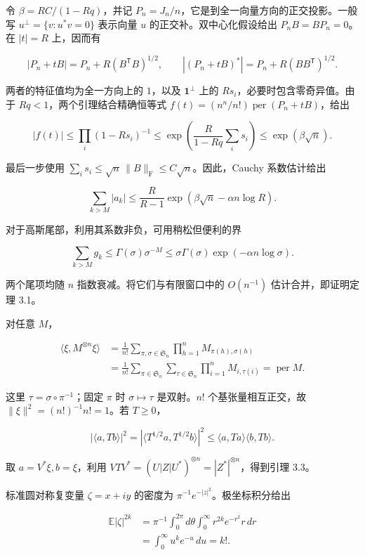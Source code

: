 \documentclass[11pt,a4paper]{article}
\begin{document}
令 \(\beta=RC/(1-Rq)\)，并记 \(P_n=J_n/n\)，它是到全一向量方向的正交投影。一般写 \(u^\perp=\{v:u^*v=0\}\) 表示向量 \(u\) 的正交补。双中心化假设给出 \(P_nB=BP_n=0\)。在 \(|t|=R\) 上，因而有

\[|P_n+tB|=P_n+R(B^{\mathsf T}B)^{1/2},
\qquad
|(P_n+tB)^*|=P_n+R(BB^{\mathsf T})^{1/2}.\]

两者的特征值均为全一方向上的 \(1\)，以及 \(\mathbf1^\perp\) 上的 \(Rs_i\)，必要时包含零奇异值。由于 \(Rq<1\)，两个引理结合精确恒等式 \(f(t)=(n^n/n!)\operatorname{per}(P_n+tB)\)，给出

\[|f(t)|\le\prod_i(1-Rs_i)^{-1}
\le\exp\!\left(\frac{R}{1-Rq}\sum_i s_i\right)
\le\exp(\beta\sqrt n).\]

最后一步使用 \(\sum_i s_i\le\sqrt n\,\|B\|_{\mathrm F}\le C\sqrt n\)。因此，Cauchy 系数估计给出

\[\sum_{k>M}|a_k|
\le\frac{R}{R-1}
\exp\!\left(\beta\sqrt n-\alpha n\log R\right).\]

对于高斯尾部，利用其系数非负，可用稍松但便利的界

\[\sum_{k>M}g_k
\le \Gamma(\sigma)\sigma^{-M}
\le\sigma\Gamma(\sigma)\exp\!\left(-\alpha n\log\sigma\right).\]

两个尾项均随 \(n\) 指数衰减。将它们与有限窗口中的 \(O(n^{-1})\) 估计合并，即证明定理 3.1。

对任意 \(M\)，

\[\begin{aligned}
\langle\xi,M^{\otimes n}\xi\rangle
&=\frac1{n!}\sum_{\pi,\sigma\in \mathfrak S_n}\prod_{h=1}^nM_{\pi(h),\sigma(h)}\\
&=\frac1{n!}\sum_{\pi\in \mathfrak S_n}\sum_{\tau\in \mathfrak S_n}\prod_{i=1}^nM_{i,\tau(i)}
=\operatorname{per}M.
\end{aligned}\]

这里 \(\tau=\sigma\circ\pi^{-1}\)；固定 \(\pi\) 时 \(\sigma\mapsto\tau\) 是双射。\(n!\) 个基张量相互正交，故 \(\|\xi\|^2=(n!)^{-1}n!=1\)。若 \(T\ge0\)，

\[|\langle a,Tb\rangle|^2
=|\langle T^{1/2}a,T^{1/2}b\rangle|^2
\le\langle a,Ta\rangle\langle b,Tb\rangle.\]

取 \(a=V^*\xi,b=\xi\)，利用 \(VTV^*=(U|Z|U^*)^{\otimes n}=|Z^*|^{\otimes n}\)，得到引理 3.3。

标准圆对称复变量 \(\zeta=x+iy\) 的密度为 \(\pi^{-1}e^{-|z|^2}\)。极坐标积分给出

\[\begin{aligned}
\mathbb E|\zeta|^{2k}
&=\pi^{-1}\int_0^{2\pi}\!d\theta\int_0^{\infty}r^{2k}e^{-r^2}r\,dr\\
&=\int_0^{\infty}u^ke^{-u}\,du=k!.
\end{aligned}\]
\end{document}
